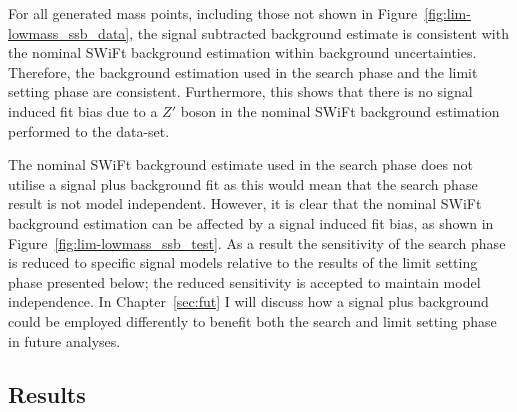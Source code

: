 For all generated mass points, including those not shown in Figure~\ref{fig:lim-lowmass_ssb_data},
the signal subtracted background estimate is consistent with the nominal SWiFt background estimation
within background uncertainties.
Therefore, the background estimation used in the search phase and the limit setting phase are consistent.
Furthermore, this shows that there is no signal induced fit bias due to a $Z'$ boson
in the nominal SWiFt background estimation performed to the \lm{} data-set.


The nominal SWiFt background estimate used in the search phase
does not utilise a signal plus background fit
as this would mean that the search phase result is not model independent.
However, it is clear that the nominal SWiFt background estimation can be affected by a signal induced fit bias,
as shown in Figure~\ref{fig:lim-lowmass_ssb_test}.
As a result the sensitivity of the search phase is reduced to specific signal models relative to the results of the limit setting phase presented below;
the reduced sensitivity is accepted to maintain model independence.
In Chapter~\ref{sec:fut} I will discuss how a signal plus background
could be employed differently to benefit both the search and limit setting phase in future analyses.

\subsection{Results}
\label{sec:lim-full_results}

